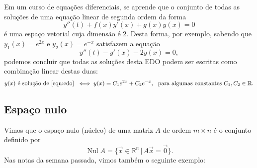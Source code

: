 \documentclass[../livro.tex]{subfiles}  %
\begin{document}
\begin{example}
	Em um curso de equações diferenciais, se aprende que o conjunto de todas as soluções de uma equação linear de segunda ordem da forma
	\begin{equation}
	y''(t) + f(x) y'(x) + g(x) y(x) = 0
	\end{equation} é uma espaço vetorial cuja dimensão é 2. Desta forma, por exemplo, sabendo que $y_1(x) = e^{2x}$ e $y_2 (x) = e^{-x}$ satisfazem a equação
	\begin{equation}\label{eqn:edo}
	y''(t) - y'(x) -2 y(x) = 0,
	\end{equation} podemos concluir que todas as soluções desta EDO podem ser escritas como combinação linear destas duas:
	\begin{equation}
	y(x) \text{ é solução de \eqref{eqn:edo} } \iff y(x) = C_1 e^{2x} + C_2 e^{-x}, \ \text{ para algumas constantes } C_1, C_2 \in \mathbb{R}.
	\end{equation}
\end{example}


\subsection{Espaço nulo}

Vimos que o espaço nulo (núcleo) de uma matriz $A$ de ordem $m \times n$ é o conjunto definido por
\begin{equation}
\operatorname{Nul} A = \big\{ \vec{x} \in \mathbb{R}^n \, | \, A\vec{x} = \vec{0}  \big\}.
\end{equation} Nas notas da semana passada, vimos também o seguinte exemplo:
\end{document}
